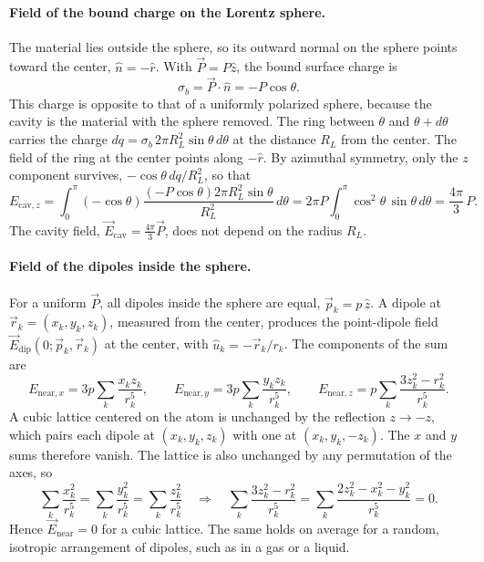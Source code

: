 \paragraph{Field of the bound charge on the Lorentz sphere.}
The material lies outside the sphere, so its outward normal on the sphere points toward the center, $\hat n = -\hat r$. With $\vec P = P\hat z$, the bound surface charge is
\begin{equation*}
    \sigma_b = \vec P\cdot\hat n = -P\cos\theta.
\end{equation*}
This charge is opposite to that of a uniformly polarized sphere, because the cavity is the material with the sphere removed. The ring between $\theta$ and $\theta + d\theta$ carries the charge $dq = \sigma_b\,2\pi R_L^2\sin\theta\,d\theta$ at the distance $R_L$ from the center. The field of the ring at the center points along $-\hat r$. By azimuthal symmetry, only the $z$ component survives, $-\cos\theta\,dq/R_L^2$, so that
\begin{equation*}
    E_{\text{cav},z} = \int_0^\pi \left(-\cos\theta\right)\frac{\left(-P\cos\theta\right)2\pi R_L^2\sin\theta}{R_L^2}\,d\theta
    = 2\pi P\int_0^\pi \cos^2\theta\,\sin\theta\,d\theta
    = \frac{4\pi}{3}\,P.
\end{equation*}
The cavity field, $\vec E_{\text{cav}} = \tfrac{4\pi}{3}\vec P$, does not depend on the radius $R_L$.

\paragraph{Field of the dipoles inside the sphere.}
For a uniform $\vec P$, all dipoles inside the sphere are equal, $\vec p_k = p\,\hat z$. A dipole at $\vec r_k = (x_k, y_k, z_k)$, measured from the center, produces the point-dipole field $\vec E_{\text{dip}}(0;\vec p_k,\vec r_k)$ at the center, with $\hat u_k = -\vec r_k/r_k$. The components of the sum are
\begin{equation*}
    E_{\text{near},x} = 3p\sum_k \frac{x_k z_k}{r_k^5}, \qquad
    E_{\text{near},y} = 3p\sum_k \frac{y_k z_k}{r_k^5}, \qquad
    E_{\text{near},z} = p\sum_k \frac{3z_k^2 - r_k^2}{r_k^5}.
\end{equation*}
A cubic lattice centered on the atom is unchanged by the reflection $z \to -z$, which pairs each dipole at $(x_k, y_k, z_k)$ with one at $(x_k, y_k, -z_k)$. The $x$ and $y$ sums therefore vanish. The lattice is also unchanged by any permutation of the axes, so
\begin{equation*}
    \sum_k \frac{x_k^2}{r_k^5} = \sum_k \frac{y_k^2}{r_k^5} = \sum_k \frac{z_k^2}{r_k^5}
    \quad\Rightarrow\quad
    \sum_k \frac{3z_k^2 - r_k^2}{r_k^5} = \sum_k \frac{2z_k^2 - x_k^2 - y_k^2}{r_k^5} = 0.
\end{equation*}
Hence $\vec E_{\text{near}} = 0$ for a cubic lattice. The same holds on average for a random, isotropic arrangement of dipoles, such as in a gas or a liquid.

